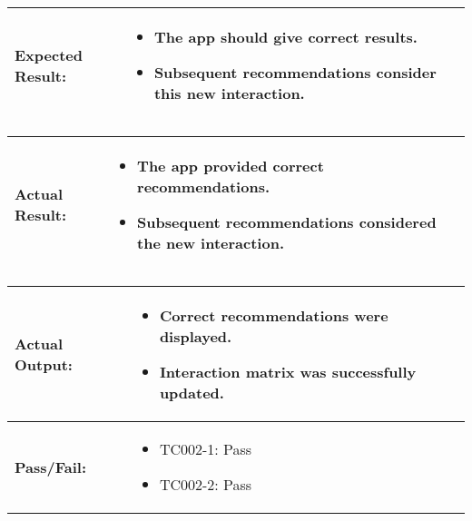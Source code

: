 \noindent
\begin{tabularx}{\textwidth}{|>{\raggedright\arraybackslash}p{4cm}|X|}
    \hline
    \textbf{Expected Result:} & 
    \begin{itemize}
        \item The app should give correct results.
        \item Subsequent recommendations consider this new interaction.
    \end{itemize}
    \\ \hline
\end{tabularx}

\noindent
\begin{tabularx}{\textwidth}{|>{\raggedright\arraybackslash}p{4cm}|X|}
    \hline
    \textbf{Actual Result:} & 
    \begin{itemize}
        \item The app provided correct recommendations.
        \item Subsequent recommendations considered the new interaction.
    \end{itemize}
    \\ \hline
\end{tabularx}

\noindent
\begin{tabularx}{\textwidth}{|>{\raggedright\arraybackslash}p{4cm}|X|}
    \hline
    \textbf{Actual Output:} & 
    \begin{itemize}
        \item Correct recommendations were displayed.
        \item Interaction matrix was successfully updated.
    \end{itemize}
    \\ \hline
    \textbf{Pass/Fail:} & 
    \begin{itemize}
        \item TC002-1: Pass
        \item TC002-2: Pass
    \end{itemize}
    \\ \hline
\end{tabularx}